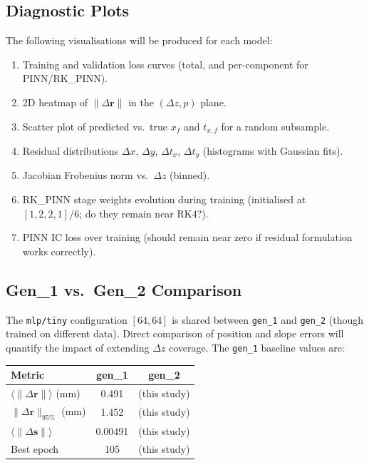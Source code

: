 \documentclass[a4paper,11pt]{article}
\newcommand{\dz}{\Delta z}
\begin{document}
\subsection{Diagnostic Plots}
\label{sec:diagnostic_plots}

The following visualisations will be produced for each model:
\begin{enumerate}
  \item Training and validation loss curves (total, and per-component for
    PINN/RK\_PINN).
  \item 2D heatmap of $\|\Delta\mathbf{r}\|$ in the $(\dz, p)$ plane.
  \item Scatter plot of predicted vs.\ true $x_f$ and $t_{x,f}$ for a
    random subsample.
  \item Residual distributions $\Delta x$, $\Delta y$, $\Delta t_x$,
    $\Delta t_y$ (histograms with Gaussian fits).
  \item Jacobian Frobenius norm vs.\ $\dz$ (binned).
  \item RK\_PINN stage weights evolution during training
    (initialised at $[1,2,2,1]/6$; do they remain near RK4?).
  \item PINN IC loss over training (should remain near zero if residual
    formulation works correctly).
\end{enumerate}

\subsection{Gen\_1 vs.\ Gen\_2 Comparison}

The \texttt{mlp/tiny} configuration $[64, 64]$ is shared between
\texttt{gen\_1} and \texttt{gen\_2} (though trained on different data).
Direct comparison of position and slope errors will quantify the impact
of extending $\dz$ coverage.  The \texttt{gen\_1} baseline values are:
\begin{center}
\begin{tabular}{lcc}
\toprule
Metric & gen\_1 & gen\_2 \\
\midrule
$\langle\|\Delta\mathbf{r}\|\rangle$ (mm) & 0.491 & (this study) \\
$\|\Delta\mathbf{r}\|_{95\%}$ (mm) & 1.452 & (this study) \\
$\langle\|\Delta\mathbf{s}\|\rangle$ & 0.00491 & (this study) \\
Best epoch & 105 & (this study) \\
\bottomrule
\end{tabular}
\end{center}
\end{document}
